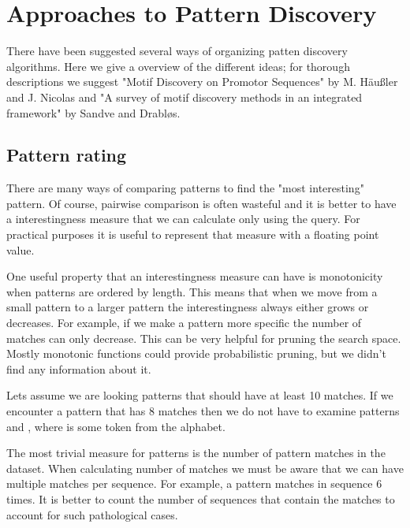 \chapter{Approaches to Pattern Discovery}
\label{c:algorithms}

There have been suggested several ways of organizing patten discovery algorithms\cite{SurveyDNAMotif, SurveyMotifDiscovery, CombinatorialSubtle, Hausler05}. Here we give a overview of the different ideas; for thorough descriptions we suggest "Motif Discovery on Promotor Sequences" by M. Häußler and J. Nicolas\cite{Hausler05} and "A survey of motif discovery methods in an integrated framework" by Sandve and Drabløs\cite{SurveyMotifDiscovery}.

\section{Pattern rating}

There are many ways of comparing patterns to find the "most interesting" pattern. Of course, pairwise comparison is often wasteful and it is better to have a interestingness measure that we can calculate only using the query. For practical purposes it is useful to represent that measure with a floating point value.

One useful property that an interestingness measure can have is monotonicity when patterns are ordered by length. This means that when we move from a small pattern to a larger pattern the interestingness always either grows or decreases. For example, if we make a pattern more specific the number of matches can only decrease. This can be very helpful for pruning the search space. Mostly monotonic functions could provide probabilistic pruning, but we didn't find any information about it.

\begin{exmp}
Lets assume we are looking patterns that should have at least 10 matches. If we encounter a pattern  that has 8 matches then we do not have to examine patterns  and , where  is some token from the alphabet.
\end{exmp}

The most trivial measure for patterns is the number of pattern matches in the dataset. When calculating number of matches we must be aware that we can have multiple matches per sequence. For example, a pattern  matches in sequence  6 times. It is better to count the number of sequences that contain the matches to account for such pathological cases.

